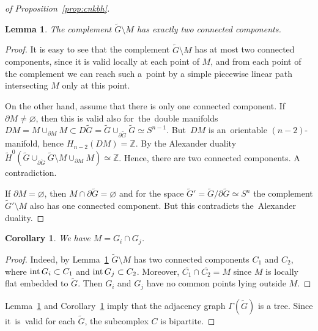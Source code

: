 \documentclass[12pt]{amsart}
\newtheorem{corollary}[formula]{Corollary}
\newtheorem{lemma}[formula]{Lemma}
\theoremstyle{definition}
\theoremstyle{remark}
\begin{document}
\begin{proof}[of Proposition~\ref{prop:cnkbh}]
\begin{lemma}\label{lem:2cc}
The complement $\widetilde{G}\setminus M$ has exactly two connected components.
\end{lemma}
\begin{proof}
It is easy to see that the complement $\widetilde{G}\setminus M$ has at most two connected components, 
since it is valid locally at each point of $M$, and from each point of the complement we can reach such 
a~point by a simple piecewise linear path intersecting $M$ only at this point.%

On the other hand, assume that there is only one connected component. If $\partial M\ne\varnothing$, then this is valid also 
for~the~double manifolds $DM=M\cup_{\partial M}M\subset D\widetilde{G}=
\widetilde{G}\cup_{\partial \widetilde{G}} \widetilde{G}\simeq S^{n-1}$.
But~$DM$ is an~orientable $(n-2)$-manifold, hence $H_{n-2}(DM)=\mathbb Z$. By the Alexander duality
$\widetilde{H}^0(\widetilde{G}\cup_{\partial \widetilde{G}} \widetilde{G}\setminus M\cup_{\partial M}M)\simeq \mathbb Z$. 
Hence, there are two connected components. A contradiction. 

If $\partial M=\varnothing$, then $M\cap \partial\widetilde{G}=\varnothing$ and for the space 
$\widetilde{G}'=\widetilde{G}/\partial \widetilde{G}\simeq S^n$ the complement $\widetilde{G}'\setminus M$
also has one connected component. But this contradicts the~Alexander duality. 
\end{proof}

\begin{corollary}\label{cor:1cc}
We have $M=G_i\cap G_j$.
\end{corollary}
\begin{proof}
Indeed, by Lemma~\ref{lem:2cc} $\widetilde{G}\setminus M$ has two connected components $C_1$ and $C_2$,
where ${\rm int}\, G_i\subset C_1$ and ${\rm int}\, G_j\subset C_2$. 
Moreover, $\overline{C_1}\cap \overline {C_2}=M$ since $M$ is locally flat embedded to $\widetilde{G}$. 
Then $G_i$ and $G_j$ have no common points lying outside $M$.   
\end{proof}
Lemma~\ref{lem:2cc} and  Corollary~\ref{cor:1cc} imply that the adjacency graph $\Gamma(\widetilde{G})$ is a tree.
Since it~is~valid for each $\widetilde{G}$, the subcomplex $C$ is bipartite.
\end{proof}
\end{document}
